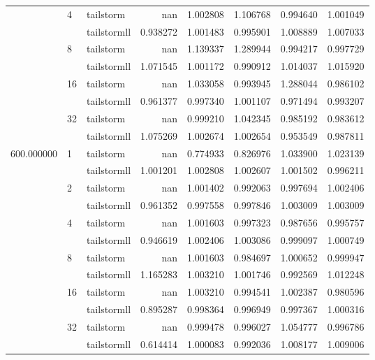 \begin{tabular}{lllrrrrr}
 & \multirow[c]{2}{*}{4} & tailstorm & nan & 1.002808 & 1.106768 & 0.994640 & 1.001049 \\
 &  & tailstormll & 0.938272 & 1.001483 & 0.995901 & 1.008889 & 1.007033 \\
 & \multirow[c]{2}{*}{8} & tailstorm & nan & 1.139337 & 1.289944 & 0.994217 & 0.997729 \\
 &  & tailstormll & 1.071545 & 1.001172 & 0.990912 & 1.014037 & 1.015920 \\
 & \multirow[c]{2}{*}{16} & tailstorm & nan & 1.033058 & 0.993945 & 1.288044 & 0.986102 \\
 &  & tailstormll & 0.961377 & 0.997340 & 1.001107 & 0.971494 & 0.993207 \\
 & \multirow[c]{2}{*}{32} & tailstorm & nan & 0.999210 & 1.042345 & 0.985192 & 0.983612 \\
 &  & tailstormll & 1.075269 & 1.002674 & 1.002654 & 0.953549 & 0.987811 \\
\multirow[c]{12}{*}{600.000000} & \multirow[c]{2}{*}{1} & tailstorm & nan & 0.774933 & 0.826976 & 1.033900 & 1.023139 \\
 &  & tailstormll & 1.001201 & 1.002808 & 1.002607 & 1.001502 & 0.996211 \\
 & \multirow[c]{2}{*}{2} & tailstorm & nan & 1.001402 & 0.992063 & 0.997694 & 1.002406 \\
 &  & tailstormll & 0.961352 & 0.997558 & 0.997846 & 1.003009 & 1.003009 \\
 & \multirow[c]{2}{*}{4} & tailstorm & nan & 1.001603 & 0.997323 & 0.987656 & 0.995757 \\
 &  & tailstormll & 0.946619 & 1.002406 & 1.003086 & 0.999097 & 1.000749 \\
 & \multirow[c]{2}{*}{8} & tailstorm & nan & 1.001603 & 0.984697 & 1.000652 & 0.999947 \\
 &  & tailstormll & 1.165283 & 1.003210 & 1.001746 & 0.992569 & 1.012248 \\
 & \multirow[c]{2}{*}{16} & tailstorm & nan & 1.003210 & 0.994541 & 1.002387 & 0.980596 \\
 &  & tailstormll & 0.895287 & 0.998364 & 0.996949 & 0.997367 & 1.000316 \\
 & \multirow[c]{2}{*}{32} & tailstorm & nan & 0.999478 & 0.996027 & 1.054777 & 0.996786 \\
 &  & tailstormll & 0.614414 & 1.000083 & 0.992036 & 1.008177 & 1.009006 \\
\end{tabular}
